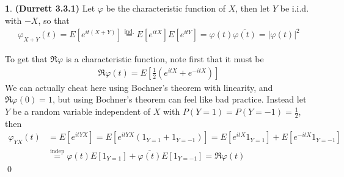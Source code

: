 \documentclass{article}
\theoremstyle{definition}
\newtheorem{pb}{}
\newcommand{\abs}[1]{\left\vert#1\right\vert}
\begin{document}
    \begin{pb}\textbf{(Durrett 3.3.1)}
        Let \(\varphi\) be the characteristic function of \(X\), then let \(Y\) be i.i.d. with \(-X\), so that
        \begin{align*}
            \varphi_{X+Y}(t) = E[e^{it(X+Y)}] \overset{\text{ind.}}{=} E[e^{itX}]E[e^{itY}] = \varphi(t)\overline{\varphi(t)} = \abs{\varphi(t)}^2
        \end{align*}

        To get that \(\Re \varphi\) is a characteristic function, note first that it must be
        \begin{align*}
            \Re \varphi(t) = E\left[\frac{1}{2}(e^{itX} + e^{-itX})\right]
        \end{align*}
        We can actually cheat here using Bochner's theorem with linearity, and \(\Re \varphi(0) = 1\), but using Bochner's theorem can feel like bad practice. Instead let \(Y\) be a random variable independent of \(X\) with \(P(Y = 1) = P(Y = -1) = \frac12\), then
        \begin{align*}
            \varphi_{YX}(t) &= E[e^{itYX}] = E[e^{itYX}(1_{Y=1} + 1_{Y=-1})] = E[e^{itX}1_{Y=1}] + E[e^{-itX}1_{Y=-1}] \\
            &\overset{\text{indep}}{=} \varphi(t)E[1_{Y=1}] + \overline{\varphi(t)}E[1_{Y=-1}] = \Re \varphi(t)
        \end{align*} \qed
    \end{pb}
\end{document}
